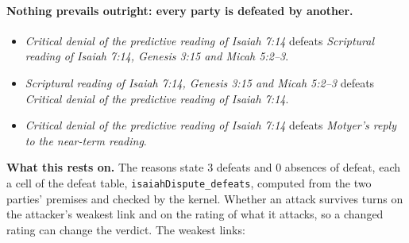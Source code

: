 \documentclass[11pt]{article}
\begin{document}
\paragraph{Nothing prevails outright: every party is defeated by another.}
\begin{itemize}
\item \emph{Critical denial of the predictive reading of Isaiah 7:14} defeats \emph{Scriptural reading of Isaiah 7:14, Genesis 3:15 and Micah 5:2–3}.
\item \emph{Scriptural reading of Isaiah 7:14, Genesis 3:15 and Micah 5:2–3} defeats \emph{Critical denial of the predictive reading of Isaiah 7:14}.
\item \emph{Critical denial of the predictive reading of Isaiah 7:14} defeats \emph{Motyer's reply to the near-term reading}.
\end{itemize}
\par\noindent\textbf{What this rests on.} The reasons state 3 defeats and 0 absences of defeat, each a cell of the defeat table, \texttt{isaiah\allowbreak{}Dispute\_\allowbreak{}defeats}, computed from the two parties' premises and checked by the kernel. Whether an attack survives turns on the attacker's weakest link and on the rating of what it attacks, so a changed rating can change the verdict. The weakest links:
\end{document}
